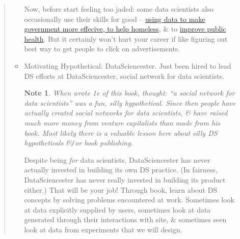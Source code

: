 \documentclass{article}
\newtheorem{note}{Note}
\begin{document}
\begin{itemize}
\begin{quote}
\begin{itemize}
			Now, before start feeling too jaded: some data scientists also occasionally use their skills for good -- \href{https://www.marketplace.org/2014/08/22/tech/beyond-ad-clicks-using-big-data-social-good}{using data to make government more effecive, to help homeless}, \& to \href{https://plus.google.com/communities/109572103057302114737}{improve public health}. But it certainly won't hurt your career if like figuring out best way to get people to click on advertisements.
			\item {\sf Motivating Hypothetical: DataSciencester.} Just been hired to lead DS efforts at DataSciencester, social network for data scientists.
			\begin{note}
				When wrote 1e of this book, thought: ``a social network for data scientists'' was a fun, silly hypothetical. Since then people have actually created social networks for data scientists, \& have raised much more money from venture capitalists than made from his book. Most likely there is a valuable lesson here about silly DS hypotheticals \&{\tt/}or book publishing.
			\end{note}
			Despite being {\it for} data scientists, DataSciencester has never actually invested in building its own DS practice. (In fairness, DataSciencester has never really invested in building its product either.) That will be your job! Through book, learn about DS concepts by solving problems encountered at work. Sometimes look at data explicitly supplied by users, sometimes look at data generated through their interactions with site, \& sometimes seen look at data from experiments that we will design.
			

\end{itemize}
\end{quote}
\end{itemize}
\end{document}
